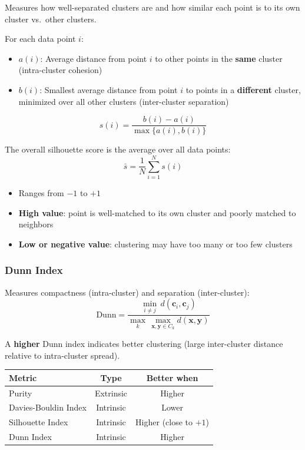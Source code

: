\documentclass[11pt,a4paper]{article}
\theoremstyle{definition}
\theoremstyle{plain}
\theoremstyle{remark}
\begin{document}
Measures how well-separated clusters are and how similar each point is to its own cluster vs.\ other clusters.

For each data point $i$:
\begin{itemize}
    \item $a(i)$: Average distance from point $i$ to other points in the \textbf{same} cluster (intra-cluster cohesion)
    \item $b(i)$: Smallest average distance from point $i$ to points in a \textbf{different} cluster, minimized over all other clusters (inter-cluster separation)
\end{itemize}

\[
s(i) = \frac{b(i) - a(i)}{\max\{a(i), b(i)\}}
\]

The overall silhouette score is the average over all data points:
\[
\bar{s} = \frac{1}{N} \sum_{i=1}^{N} s(i)
\]

\begin{itemize}
    \item Ranges from $-1$ to $+1$
    \item \textbf{High value}: point is well-matched to its own cluster and poorly matched to neighbors
    \item \textbf{Low or negative value}: clustering may have too many or too few clusters
\end{itemize}

\subsubsection{Dunn Index}

Measures compactness (intra-cluster) and separation (inter-cluster):
\[
\text{Dunn} = \frac{\displaystyle\min_{i \neq j} \, d(\mathbf{c}_i, \mathbf{c}_j)}{\displaystyle\max_{k} \, \max_{\mathbf{x}, \mathbf{y} \in C_k} d(\mathbf{x}, \mathbf{y})}
\]

A \textbf{higher} Dunn index indicates better clustering (large inter-cluster distance relative to intra-cluster spread).

\begin{tcolorbox}[colback=blue!5!white,colframe=blue!75!black,title=\textbf{Clustering Evaluation Summary}]
\begin{center}
\renewcommand{\arraystretch}{1.4}
\begin{tabular}{|l|c|c|}
\hline
\textbf{Metric} & \textbf{Type} & \textbf{Better when} \\
\hline
Purity & Extrinsic & Higher \\
\hline
Davies-Bouldin Index & Intrinsic & Lower \\
\hline
Silhouette Index & Intrinsic & Higher (close to $+1$) \\
\hline
Dunn Index & Intrinsic & Higher \\
\hline
\end{tabular}
\end{center}
\end{tcolorbox}
\end{document}
